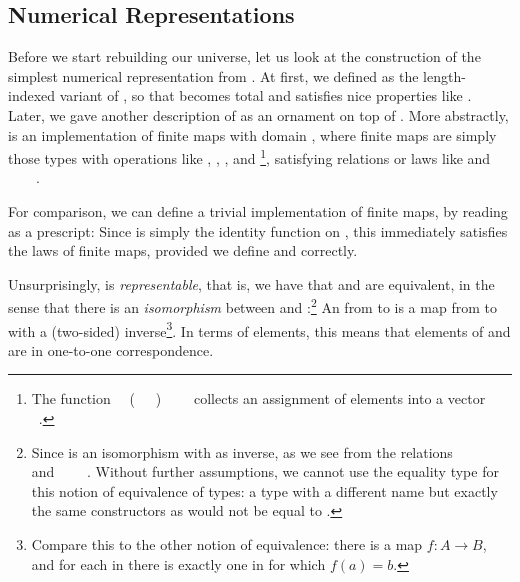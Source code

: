 \subsection{Numerical Representations}\label{sec:desc-numrep}
Before we start rebuilding our universe, let us look at the construction of the simplest numerical representation  from \bN{}. At first, we defined  as the length-indexed variant of , so that  becomes total and satisfies nice properties like . Later, we gave another description of  as an ornament on top of . More abstractly,  is an implementation of finite maps with domain , where finite maps are simply those types with operations like , , , and \footnote{The function \ \AV{:}\ (\ \ \ )\ \ \ \  collects an assignment of elements  into a vector \ .}, satisfying relations or laws like  and \ \ \ \ .

For comparison, we can define a trivial implementation of finite maps, by reading  as a prescript:
Since  is simply the identity function on , this immediately satisfies the laws of finite maps, provided we define  and  correctly.

Unsurprisingly,  is \emph{representable}, that is, we have that  and  are equivalent, in the sense that there is an \emph{isomorphism} between  and :\footnote{Since  is an isomorphism with  as inverse, as we see from the relations \ \ \ \  and  \ \ \ \ . Without further assumptions, we cannot use the equality type  for this notion of equivalence of types: a type with a different name but exactly the same constructors as  would not be equal to .}
An  from  to  is a map from  to  with a (two-sided) inverse\footnote{Compare this to the other notion of equivalence: there is a map $f : A \to B$, and for each  in  there is exactly one  in  for which $f(a) = b$.}. In terms of elements, this means that elements of  and  are in one-to-one correspondence.

